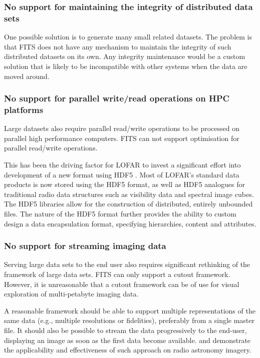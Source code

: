 \documentclass[final,authoryear,5p,times,twocolumn]{elsarticle}
\begin{document}
{{\subsubsection{No support for maintaining the integrity of distributed data sets}

One possible solution is to generate many small related datasets.
The problem is that FITS does not have any mechanism to maintain the
integrity of such distributed datasets on its own. Any integrity
maintenance would be a custom solution that is likely to be
incompatible with other systems when the data are moved around.

\subsubsection{No support for parallel write/read operations on HPC platforms}

Large datasets also require parallel read/write operations to be processed on 
parallel high performance computers. FITS can not support optimisation for 
parallel read/write operations. 

This has been the driving factor for LOFAR to 
invest a significant effort into development of a new format using
HDF5  \citep{2012ASPC..461..283A}. Most of LOFAR's standard data products 
is now stored using the HDF5 format, as well as HDF5 analogues for traditional radio data 
structures such as visibility data and spectral image cubes. The HDF5 libraries allow 
for the construction of distributed, entirely unbounded files. The nature of the HDF5 
format further provides the ability to custom design a data encapsulation format, 
specifying hierarchies, content and attributes.

\subsubsection{No support for streaming imaging data}
\label{section_stream_image}

Serving large data sets to the end user also requires significant
rethinking of the framework of large data sets. FITS can only support a
cutout framework.  However, it is unreasonable that a cutout framework
can be of use for visual exploration of multi-petabyte imaging data.

A reasonable framework should be able to support multiple representations
of the same data (e.g., multiple resolutions or fidelities), preferably
from a single master file. It should also be possible to stream the data
progressively to the end-user, displaying an image as soon
as the first data become available. \citealt{2014Kitaeff} and 
\citealt{2014arXiv1401.7433P}  demonstrate the applicability and effectiveness 
of such approach on radio astronomy imagery. 

}}
\end{document}
